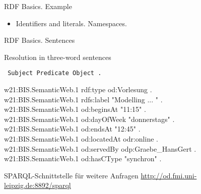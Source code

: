 \documentclass{beamer}
\def\lt{\texttt{<}}
\def\gt{\texttt{>}}
\begin{document}
\begin{frame}{RDF Basics. Example}

  {\small\tt {}}
  
  \begin{itemize}
  \item Identifiers and literals. Namespaces.
  \end{itemize}
\end{frame}
\begin{frame}{RDF Basics. Sentences}

Resolution in three-word sentences
\begin{center}\tt
  Subject Predicate Object .
\end{center}

  {\small\tt \begin{tabbing}
    w21:BIS.SemanticWeb.1 rdf:type od:Vorlesung .\\
    w21:BIS.SemanticWeb.1 rdfs:label	"Modelling ... " .\\
    w21:BIS.SemanticWeb.1 od:beginsAt	"11:15" .\\
    w21:BIS.SemanticWeb.1 od:dayOfWeek	"donnerstags" .\\
    w21:BIS.SemanticWeb.1 od:endsAt	"12:45" .\\
    w21:BIS.SemanticWeb.1 od:locatedAt	odr:online .\\
    w21:BIS.SemanticWeb.1 od:servedBy	odp:Graebe\_HansGert .\\
    w21:BIS.SemanticWeb.1 od:hasCType	"synchron" .
  \end{tabbing}}

  SPARQL-Schnittstelle für weitere Anfragen
  \url{http://od.fmi.uni-leipzig.de:8892/sparql}
\end{frame}
\end{document}
